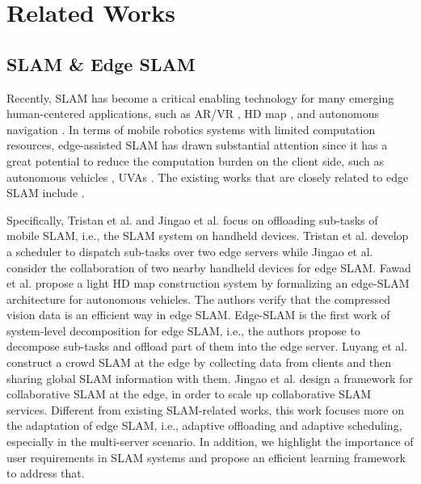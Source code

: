 \section{Related Works}
\label{relatedwork} 

\subsection{SLAM \& Edge SLAM}
Recently, SLAM has become a critical enabling technology for many emerging human-centered applications, such as AR/VR \cite{savva2019habitat}, HD map \cite{ahmad2020carmap, qiu2018avr}, and autonomous navigation \cite{vithalani2020autonomous}. 
In terms of mobile robotics systems with limited computation resources, edge-assisted SLAM has drawn substantial attention since it has a great potential to reduce the computation burden on the client side, such as autonomous vehicles \cite{zhang2019mobile}, UVAs \cite{chen2021edge}. The existing works that are closely related to edge SLAM include
\cite{braud2020multipath}\cite{ahmad2020carmap}\cite{xu2020edge}\cite{ben2020edge}\cite{liu2021edgesharing}\cite{xu2022swarmmap}. 

Specifically, Tristan et al. \cite{braud2020multipath} and Jingao et al. \cite{xu2020edge} focus on offloading sub-tasks of mobile SLAM, i.e., the SLAM system on handheld devices. Tristan et al. \cite{braud2020multipath} develop a scheduler to dispatch sub-tasks over two edge servers while Jingao et al. \cite{xu2020edge} consider the collaboration of two nearby handheld devices for edge SLAM. Fawad et al. \cite{ahmad2020carmap} propose a light HD map construction system by formalizing an edge-SLAM architecture for autonomous vehicles. The authors verify that the compressed vision data is an efficient way in edge SLAM. Edge-SLAM \cite{ben2020edge} is the first work of system-level decomposition for edge SLAM, i.e., the authors propose to decompose sub-tasks and offload part of them into the edge server. Luyang et al. \cite{liu2021edgesharing} construct a crowd SLAM at the edge by collecting data from clients and then sharing global SLAM information with them. Jingao et al. \cite{xu2022swarmmap} design a framework for collaborative SLAM at the edge, in order to scale up collaborative SLAM services. Different from existing SLAM-related works, this work focuses more on the adaptation of edge SLAM, i.e., adaptive offloading and adaptive scheduling, especially in the multi-server scenario. In addition, we highlight the importance of user requirements in SLAM systems and propose an efficient learning framework to address that.
  
